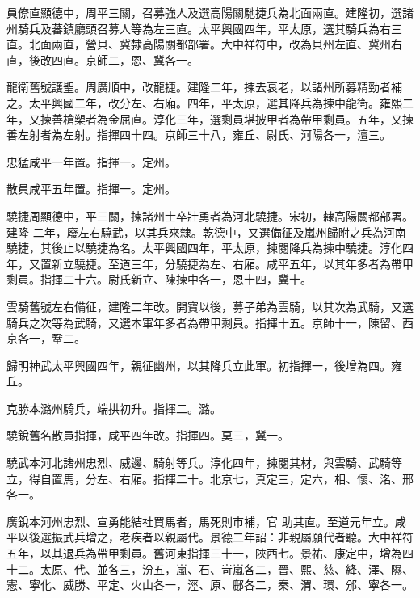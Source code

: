 \begin{pinyinscope}
 員僚直顯德中，周平三關，召募強人及選高陽關馳捷兵為北面兩直。建隆初，選諸州騎兵及蕃鎮廳頭召募人等為左三直。太平興國四年，平太原，選其騎兵為右三直。北面兩直，營貝、冀隸高陽關都部署。大中祥符中，改為貝州左直、冀州右直，後改四直。京師二，恩、冀各一。



 龍衛舊號護聖。周廣順中，改龍捷。建隆二年，揀去衰老，以諸州所募精勁者補之。太平興國二年，改分左、右廂。四年，平太原，選其降兵為揀中龍衛。雍熙二年，又揀善槍槊者為金屈直。淳化三年，選剩員堪披甲者為帶甲剩員。五年，又揀善左射者為左射。指揮四十四。京師三十八，雍丘、尉氏、河陽各一，澶三。



 忠猛咸平一年置。指揮一。定州。



 散員咸平五年置。指揮一。定州。



 驍捷周顯德中，平三關，揀諸州士卒壯勇者為河北驍捷。宋初，隸高陽關都部署。建隆
 二年，廢左右驍武，以其兵來隸。乾德中，又選備征及嵐州歸附之兵為河南驍捷，其後止以驍捷為名。太平興國四年，平太原，揀閱降兵為揀中驍捷。淳化四年，又置新立驍捷。至道三年，分驍捷為左、右廂。咸平五年，以其年多者為帶甲剩員。指揮二十六。尉氏新立、陳揀中各一，恩十四，冀十。



 雲騎舊號左右備征，建隆二年改。開寶以後，募子弟為雲騎，以其次為武騎，又選騎兵之次等為武騎，又選本軍年多者為帶甲剩員。指揮十五。京師十一，陳留、西京各一，鞏二。



 歸明神武太平興國四年，親征幽州，以其降兵立此軍。初指揮一，後增為四。雍丘。



 克勝本潞州騎兵，端拱初升。指揮二。潞。



 驍銳舊名散員指揮，咸平四年改。指揮四。莫三，冀一。



 驍武本河北諸州忠烈、威邊、騎射等兵。淳化四年，揀閱其材，與雲騎、武騎等立，得自置馬，分左、右廂。指揮二十。北京七，真定三，定六，相、懷、洺、邢各一。



 廣銳本河州忠烈、宣勇能結社買馬者，馬死則市補，官
 助其直。至道元年立。咸平以後選振武兵增之，老疾者以親屬代。景德二年詔：非親屬願代者聽。大中祥符五年，以其退兵為帶甲剩員。舊河東指揮三十一，陜西七。景祐、康定中，增為四十二。太原、代、並各三，汾五，嵐、石、岢嵐各二，晉、熙、慈、絳、澤、隰、憲、寧化、威勝、平定、火山各一，涇、原、鄜各二，秦、渭、環、邠、寧各一。




\end{pinyinscope}
